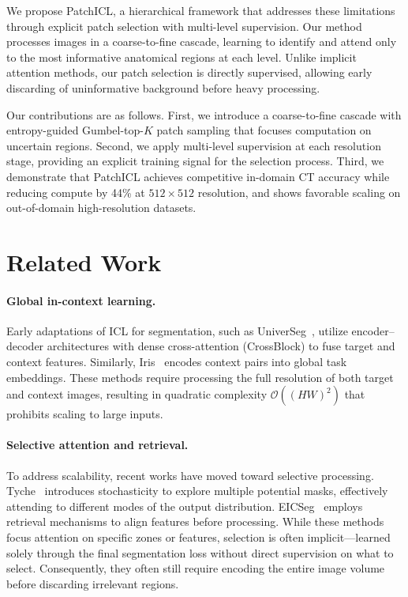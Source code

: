 \documentclass[10pt,twocolumn,letterpaper]{article}
\begin{document}
We propose PatchICL, a hierarchical framework that addresses these limitations through explicit patch selection with multi-level supervision. Our method processes images in a coarse-to-fine cascade, learning to identify and attend only to the most informative anatomical regions at each level. Unlike implicit attention methods, our patch selection is directly supervised, allowing early discarding of uninformative background before heavy processing.

Our contributions are as follows. First, we introduce a coarse-to-fine cascade with entropy-guided Gumbel-top-$K$ patch sampling that focuses computation on uncertain regions. Second, we apply multi-level supervision at each resolution stage, providing an explicit training signal for the selection process. Third, we demonstrate that PatchICL achieves competitive in-domain CT accuracy while reducing compute by 44\% at $512\times512$ resolution, and shows favorable scaling on out-of-domain high-resolution datasets.

\section{Related Work}
\label{sec:related}

\paragraph{Global in-context learning.}
Early adaptations of ICL for segmentation, such as UniverSeg~\cite{butoiUniverSegUniversalMedical2023}, utilize encoder--decoder architectures with dense cross-attention (CrossBlock) to fuse target and context features. Similarly, Iris~\cite{gaoShowSegmentUniversal2025} encodes context pairs into global task embeddings. These methods require processing the full resolution of both target and context images, resulting in quadratic complexity $\mathcal{O}((HW)^2)$ that prohibits scaling to large inputs.

\paragraph{Selective attention and retrieval.}
To address scalability, recent works have moved toward selective processing. Tyche~\cite{rakicTycheStochasticInContext2025} introduces stochasticity to explore multiple potential masks, effectively attending to different modes of the output distribution. EICSeg~\cite{xieEICSegUniversalMedical2026} employs retrieval mechanisms to align features before processing. While these methods focus attention on specific zones or features, selection is often implicit---learned solely through the final segmentation loss without direct supervision on what to select. Consequently, they often still require encoding the entire image volume before discarding irrelevant regions.
\end{document}
